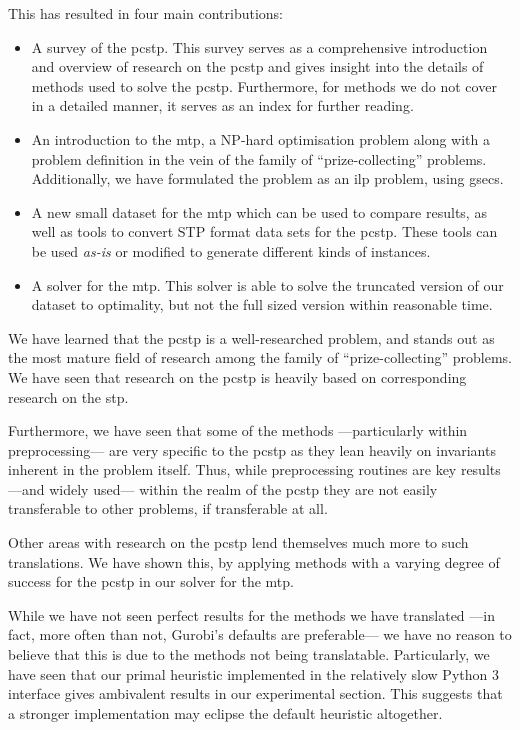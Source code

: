 This has resulted in four main contributions:
\begin{itemize}
\item A survey of the \gls{pcstp}. This survey serves as a comprehensive introduction
  and overview of research on the \gls{pcstp} and gives insight into the details of
  methods used to solve the \gls{pcstp}. Furthermore, for methods we do not cover
  in a detailed manner, it serves as an index for further reading.
\item An introduction to the \acrlong{mtp}, a NP-hard optimisation problem along with
  a problem definition in the vein of the family of ``prize-collecting'' problems.
  Additionally, we have formulated the problem as an \gls{ilp} problem, using \glspl{gsec}.
\item A new small dataset for the \gls{mtp} which can be used to compare results, as well
  as tools to convert STP format data sets for the \gls{pcstp}. These tools can be used
  \textit{as-is} or modified to generate different kinds of instances.
\item A solver for the \gls{mtp}. This solver is able to solve the truncated version of
  our dataset to optimality, but not the full sized version within reasonable time.
\end{itemize}

\bigskip

We have learned that the \gls{pcstp}
is a well-researched problem, and stands out as the most mature field of
research among the family of ``prize-collecting'' problems.
We have seen that research on the \gls{pcstp} is heavily based on corresponding
research on the \gls{stp}.

Furthermore, we have seen that some of the methods
---particularly within preprocessing---
are very specific to the \gls{pcstp} as they lean heavily on
invariants inherent in the problem itself. Thus, while preprocessing routines
are key results ---and widely used--- within the realm of the \gls{pcstp}
they are not easily transferable to other problems, if transferable at all.

Other areas with research on the \gls{pcstp} lend themselves much more to such
translations. We have shown this, by applying methods
with a varying degree of success for the
\gls{pcstp} in our solver for the \gls{mtp}.

While we have not seen perfect results for the methods we have translated
---in fact, more often than not, Gurobi's defaults are preferable---
we have no reason to believe that this is due to the methods not being
translatable. Particularly, we have seen that our primal heuristic implemented
in the relatively slow Python 3 interface gives ambivalent results in our experimental
section. This suggests that a stronger implementation may eclipse the default heuristic
altogether.


